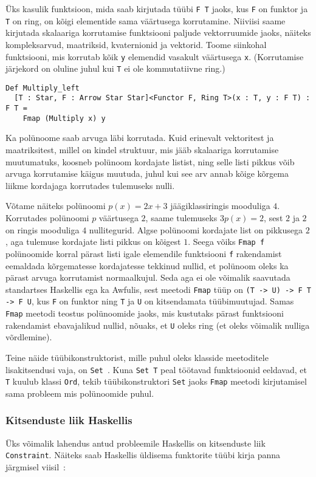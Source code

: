 \documentclass[12pt]{article}
\begin{document}
      Üks kasulik funktsioon, mida saab kirjutada tüübi \verb!F T! jaoks, kus \verb!F! on funktor ja \verb!T! on ring, on kõigi elementide sama väärtusega korrutamine. Niiviisi saame kirjutada skalaariga korrutamise funktsiooni paljude vektorruumide jaoks, näiteks kompleksarvud, maatriksid, kvaternionid ja vektorid. Toome siinkohal funktsiooni, mis korrutab kõik \verb!y! elemendid vasakult väärtusega \verb!x!. (Korrutamise järjekord on oluline juhul kui \verb!T! ei ole kommutatiivne ring.)

      \begin{verbatim}Def Multiply_left
  [T : Star, F : Arrow Star Star]<Functor F, Ring T>(x : T, y : F T) : F T =
    Fmap (Multiply x) y\end{verbatim}

      Ka polünoome saab arvuga läbi korrutada. Kuid erinevalt vektoritest ja maatriksitest, millel on kindel struktuur, mis jääb skalaariga korrutamise muutumatuks, koosneb polünoom kordajate listist, ning selle listi pikkus võib arvuga korrutamise käigus muutuda, juhul kui see arv annab kõige kõrgema liikme kordajaga korrutades tulemuseks nulli.

      Võtame näiteks polünoomi $p(x)=2x+3$ jäägiklassiringis mooduliga $4$. Korrutades polünoomi $p$ väärtusega $2$, saame tulemuseks $3p(x)=2$, sest $2$ ja $2$ on ringis mooduliga $4$ nullitegurid. Algse polünoomi kordajate list on pikkusega $2$, aga tulemuse kordajate listi pikkus on kõigest $1$. Seega võiks \verb!Fmap f! polünoomide korral pärast listi igale elemendile funktsiooni \verb!f! rakendamist eemaldada kõrgematesse kordajatesse tekkinud nullid, et polünoom oleks ka pärast arvuga korrutamist normaalkujul. Seda aga ei ole võimalik saavutada standartses Haskellis ega ka Awfulis, sest meetodi \verb!Fmap! tüüp on \verb!(T -> U) -> F T -> F U!, kus \verb!F! on funktor ning \verb!T! ja \verb!U! on kitsendamata tüübimuutujad. Samas \verb!Fmap! meetodi teostus polünoomide jaoks, mis kustutaks pärast funktsiooni rakendamist ebavajalikud nullid, nõuaks, et \verb!U! oleks ring (et oleks võimalik nulliga võrdlemine).

      Teine näide tüübikonstruktorist, mille puhul oleks klasside meetoditele lisakitsendusi vaja, on \verb!Set!~\cite{Cat}. Kuna \verb!Set T! peal töötavad funktsioonid eeldavad, et \verb!T! kuulub klassi \verb!Ord!, tekib tüübikonstruktori \verb!Set! jaoks \verb!Fmap! meetodi kirjutamisel sama probleem mis polünoomide puhul.
      \subsubsection{Kitsenduste liik Haskellis}
        Üks võimalik lahendus antud probleemile Haskellis on kitsenduste liik \verb!Constraint!. Näiteks saab Haskellis üldisema funktorite tüübi kirja panna järgmisel viisil~\cite{Cat}:
\end{document}
